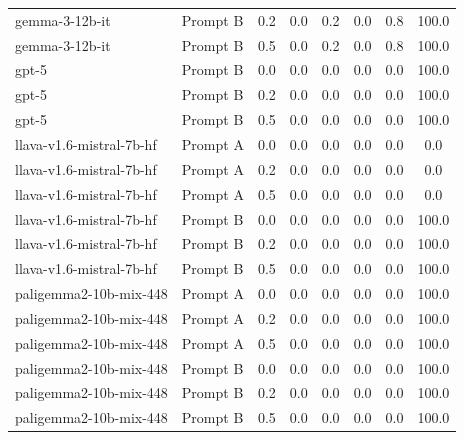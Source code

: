 \begin{tabular}{l l c c c c c c}
gemma-3-12b-it & Prompt B & 0.2 & 0.0 & 0.2 & 0.0 & 0.8 & 100.0 \\
gemma-3-12b-it & Prompt B & 0.5 & 0.0 & 0.2 & 0.0 & 0.8 & 100.0 \\
gpt-5 & Prompt B & 0.0 & 0.0 & 0.0 & 0.0 & 0.0 & 100.0 \\
gpt-5 & Prompt B & 0.2 & 0.0 & 0.0 & 0.0 & 0.0 & 100.0 \\
gpt-5 & Prompt B & 0.5 & 0.0 & 0.0 & 0.0 & 0.0 & 100.0 \\
llava-v1.6-mistral-7b-hf & Prompt A & 0.0 & 0.0 & 0.0 & 0.0 & 0.0 & 0.0 \\
llava-v1.6-mistral-7b-hf & Prompt A & 0.2 & 0.0 & 0.0 & 0.0 & 0.0 & 0.0 \\
llava-v1.6-mistral-7b-hf & Prompt A & 0.5 & 0.0 & 0.0 & 0.0 & 0.0 & 0.0 \\
llava-v1.6-mistral-7b-hf & Prompt B & 0.0 & 0.0 & 0.0 & 0.0 & 0.0 & 100.0 \\
llava-v1.6-mistral-7b-hf & Prompt B & 0.2 & 0.0 & 0.0 & 0.0 & 0.0 & 100.0 \\
llava-v1.6-mistral-7b-hf & Prompt B & 0.5 & 0.0 & 0.0 & 0.0 & 0.0 & 100.0 \\
paligemma2-10b-mix-448 & Prompt A & 0.0 & 0.0 & 0.0 & 0.0 & 0.0 & 100.0 \\
paligemma2-10b-mix-448 & Prompt A & 0.2 & 0.0 & 0.0 & 0.0 & 0.0 & 100.0 \\
paligemma2-10b-mix-448 & Prompt A & 0.5 & 0.0 & 0.0 & 0.0 & 0.0 & 100.0 \\
paligemma2-10b-mix-448 & Prompt B & 0.0 & 0.0 & 0.0 & 0.0 & 0.0 & 100.0 \\
paligemma2-10b-mix-448 & Prompt B & 0.2 & 0.0 & 0.0 & 0.0 & 0.0 & 100.0 \\
paligemma2-10b-mix-448 & Prompt B & 0.5 & 0.0 & 0.0 & 0.0 & 0.0 & 100.0 \\
\bottomrule
\end{tabular}

